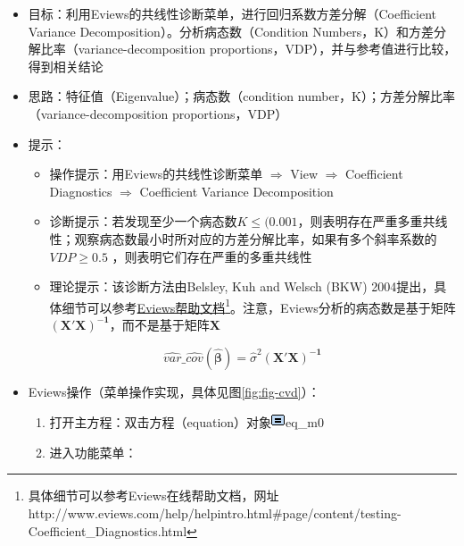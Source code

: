 \documentclass[12pt,(landscape,a4paper),(portrait,a4paper)]{article}
\providecommand{\tightlist}{%
  \setlength{\itemsep}{0pt}\setlength{\parskip}{0pt}}
\let\rmarkdownfootnote\footnote%
\def\footnote{\protect\rmarkdownfootnote}
\begin{document}
\begin{itemize}
\item
  目标：利用Eviews的共线性诊断菜单，进行回归系数方差分解（Coefficient
  Variance Decomposition）。分析病态数（Condition
  Numbers，K）和方差分解比率（variance-decomposition
  proportions，VDP），并与参考值进行比较，得到相关结论
\item
  思路：特征值（Eigenvalue）；病态数（condition
  number，K）；方差分解比率（variance-decomposition proportions，VDP）
\item
  提示：

  \begin{itemize}
  \tightlist
  \item
    操作提示：用Eviews的共线性诊断菜单 \(\Rightarrow\) View
    \(\Rightarrow\) Coefficient Diagnostics \(\Rightarrow\) Coefficient
    Variance Decomposition
  \item
    诊断提示：若发现至少一个病态数\(K \leq{(0.001}\)，则表明存在严重多重共线性；观察病态数最小时所对应的方差分解比率，如果有多个斜率系数的\(VDP \geq{0.5}\)
    ，则表明它们存在严重的多重共线性
  \item
    理论提示：该诊断方法由Belsley, Kuh and Welsch (BKW)
    2004提出，具体细节可以参考\href{http://www.eviews.com/help/helpintro.html\#page/content/testing-Coefficient_Diagnostics.html}{Eviews帮助文档}\footnote{具体细节可以参考Eviews在线帮助文档，网址http://www.eviews.com/help/helpintro.html\#page/content/testing-Coefficient\_Diagnostics.html}。注意，Eviews分析的病态数是基于矩阵\(\mathbf{(X'X)^{-1}}\)，而不是基于矩阵\(\mathbf{X}\)
  \end{itemize}

  \[\widehat{var}\_\widehat{cov}(\mathbf{\hat{\beta}})=\hat{\sigma}^2\mathbf{(X'X)^{-1}}\]
\item
  Eviews操作（菜单操作实现，具体见图\ref{fig:fig-cvd}）：

  \begin{enumerate}
  \def\labelenumi{\arabic{enumi})}
  \tightlist
  \item
    打开主方程：双击方程（equation）对象\includegraphics{picture/object/Equation.png}eq\_m0\\
  \item
    进入功能菜单：


\end{enumerate}
\end{itemize}
\end{document}
